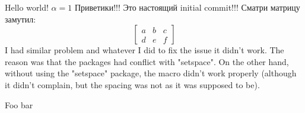 \documentclass[a4paper,14pt,russian]{extreport}
\begin{document}
    Hello world! \newline
    $\alpha = 1$ \newline
    Приветики!!!
    Это настоящий initial commit!!! 
    \newline
    Сматри матрицу замутил:
    \newline
    \[
    \begin{bmatrix}
        a & b & c \\
        d & e & f
    \end{bmatrix}
    \]
    I had similar problem and whatever I did to fix the issue it didn't work. The reason was that the packages had conflict with "setspace". On the other hand, without using the "setspace" package, the \onehalfspacing macro didn't work properly (although it didn't complain, but the spacing was not as it was supposed to be).

    \newpage
    Foo bar
\end{document}
